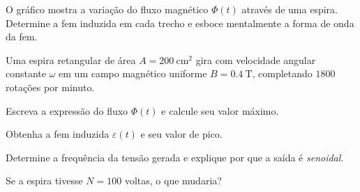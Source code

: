 \blocoaprofundamento
\begin{questao}[3]{}

O gráfico mostra a variação do fluxo magnético $\Phi(t)$ através de uma espira.
Determine a fem induzida em cada trecho e esboce mentalmente a forma de onda da
fem.




\end{questao}

\blocodesafio
\begin{questao}[4]{}

Uma espira retangular de área $A = \SI{200}{\centi\meter\squared}$ gira com
velocidade angular constante $\omega$ em um campo magnético uniforme
$B = \SI{0.4}{\tesla}$, completando $\SI{1800}{}$ rotações por minuto.
\begin{itensq}
\item Escreva a expressão do fluxo $\Phi(t)$ e calcule seu valor máximo.
\item Obtenha a fem induzida $\varepsilon(t)$ e seu valor de pico.
\item Determine a frequência da tensão gerada e explique por que a saída é
      \emph{senoidal}.
\item Se a espira tivesse $N = 100$ voltas, o que mudaria?
\end{itensq}


\end{questao}

